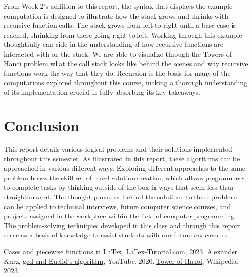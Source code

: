 \documentclass{article}
\theoremstyle{theorem}
\theoremstyle{definition}
\theoremstyle{remark}
\begin{document}
From Week 2's addition to this report, the syntax that displays the example computation is designed to illustrate how the stack grows and shrinks with recursive function calls. The stack grows from left to right until a base case is reached, shrinking from there going right to left. Working through this example thoughtfully can aide in the understanding of how recursive functions are interacted with on the stack. We are able to visualize through the Towers of Hanoi problem what the call stack looks like behind the scenes and why recursive functions work the way that they do. Recursion is the basis for many of the computations explored throughout this course, making a thorough understanding of its implementation crucial in fully absorbing its key takeaways. 

\section{Conclusion}\label{conclusions}

This report details various logical problems and their solutions implemented throughout this semester. As illustrated in this report, these algorithms can be approached in various different ways. Exploring different approaches to the same problem hones the skill set of novel solution creation, which allows programmers to complete tasks by thinking outside of the box in ways that seem less than straightforward. The thought processes behind the solutions to these problems can be applied to technical interviews, future computer science courses, and projects assigned in the workplace within the field of computer programming. The problem-solving techniques developed in this class and through this report serve as a basis of knowledge to assist students with our future endeavours. 

\begin{thebibliography}{99}
 \href{https://latex-tutorial.com/piecewise-functions-latex/}{Cases and piecewise functions in LaTex}, LaTex-Tutorial.com, 2023.
 Alexander Kurz, \href{https://www.youtube.com/watch?v=ZcJMj0antos}{gcd and Euclid's algorithm}, YouTube, 2020.
 \href{https://en.wikipedia.org/wiki/Tower_of_Hanoi}{Tower of Hanoi}, Wikipedia, 2023.
\end{thebibliography}
\end{document}

